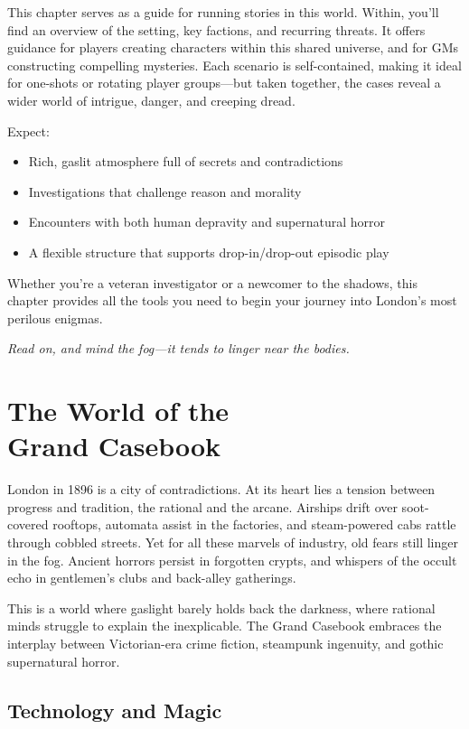 This chapter serves as a guide for running stories in this world. Within, you'll find an overview of the setting, key factions, and recurring threats. It offers guidance for players creating characters within this shared universe, and for GMs constructing compelling mysteries. Each scenario is self-contained, making it ideal for one-shots or rotating player groups—but taken together, the cases reveal a wider world of intrigue, danger, and creeping dread.

\newcolumn
Expect:
\begin{itemize}
    \item Rich, gaslit atmosphere full of secrets and contradictions
    \item Investigations that challenge reason and morality
    \item Encounters with both human depravity and supernatural horror
    \item A flexible structure that supports drop-in/drop-out episodic play
\end{itemize}

Whether you’re a veteran investigator or a newcomer to the shadows, this chapter provides all the tools you need to begin your journey into London’s most perilous enigmas.

\medskip
\noindent
\textit{Read on, and mind the fog—it tends to linger near the bodies.}

\section[The World of the Grand Casebook]{The World of the\\ Grand Casebook}

London in 1896 is a city of contradictions. At its heart lies a tension between progress and tradition, the rational and the arcane. Airships drift over soot-covered rooftops, automata assist in the factories, and steam-powered cabs rattle through cobbled streets. Yet for all these marvels of industry, old fears still linger in the fog. Ancient horrors persist in forgotten crypts, and whispers of the occult echo in gentlemen’s clubs and back-alley gatherings.

This is a world where gaslight barely holds back the darkness, where rational minds struggle to explain the inexplicable. The Grand Casebook embraces the interplay between Victorian-era crime fiction, steampunk ingenuity, and gothic supernatural horror.

\subsection{Technology and Magic}

